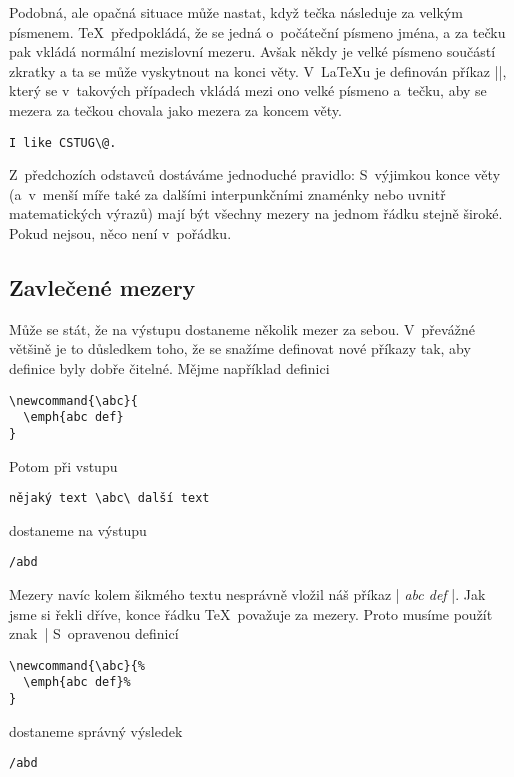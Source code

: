\documentclass{csbulletin}
\def\emph#1{{\sl#1\/}}
\begin{document}
Podobná, ale opačná situace může nastat, když tečka následuje za velkým písmenem. \TeX\ předpokládá, že se jedná o~počáteční písmeno jména, a za tečku pak vkládá normální mezislovní mezeru. Avšak někdy je velké písmeno součástí zkratky a ta se může vyskytnout na konci věty. V~\LaTeX u je definován příkaz |\@|, který se v~takových případech vkládá mezi ono velké písmeno a~tečku, aby se mezera za tečkou chovala jako mezera za koncem věty.
\begin{Verbatim}
I like CSTUG\@.
\end{Verbatim}

Z~předchozích odstavců dostáváme jednoduché pravidlo: S~výjimkou konce věty (a~v~menší míře také za dalšími interpunkčními znaménky nebo uvnitř matematických výrazů) mají být všechny mezery na jednom řádku stejně široké. Pokud nejsou, něco není v~pořádku.

\subsection{Zavlečené mezery}

Může se stát, že na výstupu dostaneme několik mezer za sebou. V~převážné většině je to důsledkem toho, že se snažíme definovat nové příkazy tak, aby definice byly dobře čitelné. Mějme například definici
\begin{Verbatim}
\newcommand{\abc}{
  \emph{abc def}
}
\end{Verbatim}
Potom při vstupu
\begin{Verbatim}
nějaký text \abc\ další text
\end{Verbatim}
dostaneme na výstupu
\begingroup
\newcommand{\abc}{
  \emph{abc def}
}%
\def\abd{\hbox{\rm
nějaký text \abc\ další text
  \unskip}}%
\begin{Verbatim}[commandchars=/()]
/abd
\end{Verbatim}
\endgroup
\noindent
Mezery navíc kolem šikmého textu nesprávně vložil náš příkaz |\abc|. Jak jsme si řekli dříve, konce řádku \TeX\ považuje za mezery. Proto musíme použít znak~|%
S~opravenou definicí
\begin{Verbatim}
\newcommand{\abc}{%
  \emph{abc def}%
}
\end{Verbatim}
dostaneme správný výsledek
\begingroup
\newcommand{\abc}{%
  \emph{abc def}%
}%
\def\abd{\hbox{\rm
nějaký text \abc\ další text
  \unskip}}%
\begin{Verbatim}[commandchars=/()]
/abd
\end{Verbatim}
\endgroup
\end{document}
